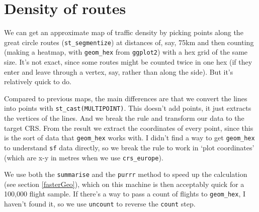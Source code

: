 \documentclass[
]{book}
\begin{document}
\hypertarget{mapDensity}{%
\section{Density of routes}\label{mapDensity}}

We can get an approximate map of traffic density by picking points along the great circle routes (\texttt{st\_segmentize}) at distances of, say, 75km and then counting (making a heatmap, with \texttt{geom\_hex} from \texttt{ggplot2}) with a hex grid of the same size. It's not exact, since some routes might be counted twice in one hex (if they enter and leave through a vertex, say, rather than along the side). But it's relatively quick to do.

Compared to previous maps, the main differences are that we convert the lines into points with \texttt{st\_cast(\textquotesingle{}MULTIPOINT\textquotesingle{})}. This doesn't add points, it just extracts the vertices of the lines. And we break the rule and transform our data to the target CRS. From the result we extract the coordinates of every point, since this is the sort of data that \texttt{geom\_hex} works with. I didn't find a way to get \texttt{geom\_hex} to understand \texttt{sf} data directly, so we break the rule to work in `plot coordinates' (which are x-y in metres when we use \texttt{crs\_europe}).

We use both the \texttt{summarise} and the \texttt{purrr} method to speed up the calculation (see section \ref{fasterGeo}), which on this machine is then acceptably quick for a 100,000 flight sample. If there's a way to pass a count of flights to \texttt{geom\_hex}, I haven't found it, so we use \texttt{uncount} to reverse the \texttt{count} step.
\end{document}
